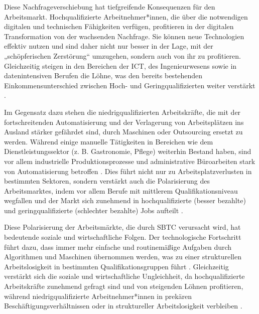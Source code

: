 
Diese Nachfrageverschiebung hat tiefgreifende Konsequenzen für den Arbeitsmarkt. 
Hochqualifizierte Arbeitnehmer*innen, die über die notwendigen digitalen und technischen 
Fähigkeiten verfügen, profitieren in der digitalen Transformation von der wachsenden 
Nachfrage. Sie können neue Technologien effektiv nutzen und sind daher nicht nur besser in 
der Lage, mit der „schöpferischen Zerstörung“ 
\parencite[vgl.][S. 81]{schumpeter1976capitalism} umzugehen, 
sondern auch von ihr zu profitieren. Gleichzeitig steigen in den Bereichen der \ac{ICT}, 
des Ingenieurwesens sowie in datenintensiven Berufen die Löhne, was den bereits bestehenden 
Einkommensunterschied zwischen Hoch- und Geringqualifizierten weiter verstärkt 
\parencite[vgl.][S. 2511]{goos2014explaining}.

Im Gegensatz dazu stehen die niedrigqualifizierten Arbeitskräfte, die mit der 
fortschreitenden Automatisierung und der Verlagerung von Arbeitsplätzen ins Ausland stärker 
gefährdet sind, durch Maschinen oder Outsourcing ersetzt zu werden. Während einige manuelle 
Tätigkeiten in Bereichen wie dem Dienstleistungssektor (z. B. Gastronomie, Pflege) 
weiterhin Bestand haben, sind vor allem industrielle Produktionsprozesse und administrative 
Büroarbeiten stark von Automatisierung betroffen \parencite[vgl.][S. 260]{frey2013thefuture}. 
Dies führt nicht nur zu Arbeitsplatzverlusten in bestimmten Sektoren, sondern verstärkt auch 
die Polarisierung des Arbeitsmarktes, indem vor allem Berufe mit mittlerem 
Qualifikationsniveau wegfallen und der Markt sich zunehmend in hochqualifizierte (besser 
bezahlte) und geringqualifizierte (schlechter bezahlte) Jobs aufteilt 
\parencite[vgl.][S. 1283]{autor2003theskill}.

Diese Polarisierung der Arbeitsmärkte, die durch \ac{SBTC} verursacht wird, hat bedeutende 
soziale und wirtschaftliche Folgen. Der technologische Fortschritt führt dazu, dass immer 
mehr einfache und routinemäßige Aufgaben durch Algorithmen und Maschinen übernommen werden, 
was zu einer strukturellen Arbeitslosigkeit in bestimmten Qualifikationsgruppen führt 
\parencite[vgl.][S. 2512]{goos2014explaining}. Gleichzeitig verstärkt sich die soziale und 
wirtschaftliche Ungleichheit, da hochqualifizierte Arbeitskräfte zunehmend gefragt sind und 
von steigenden Löhnen profitieren, während niedrigqualifizierte Arbeitnehmer*innen in 
prekären Beschäftigungsverhältnissen oder in struktureller Arbeitslosigkeit verbleiben 
\parencite[vgl.][S. 12]{arntz2016therisk}.

